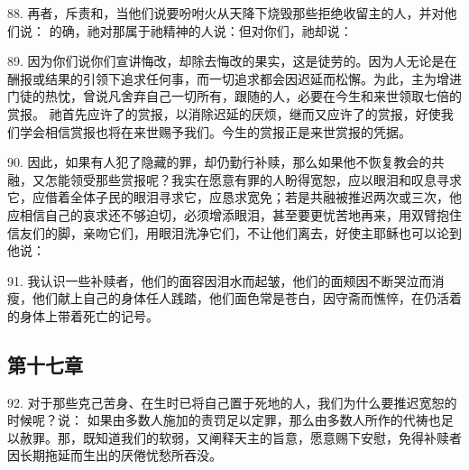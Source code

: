 88. 再者，斥责和，当他们说要吩咐火从天降下烧毁那些拒绝收留主的人，并对他们说： 的确，祂对那属于祂精神的人说：但对你们，祂却说：\par

89. 因为你们说你们宣讲悔改，却除去悔改的果实，这是徒劳的。因为人无论是在酬报或结果的引领下追求任何事，而一切追求都会因迟延而松懈。为此，主为增进门徒的热忱，曾说凡舍弃自己一切所有，跟随的人，必要在今生和来世领取七倍的赏报。 祂首先应许了的赏报，以消除迟延的厌烦，继而又应许了的赏报，好使我们学会相信赏报也将在来世赐予我们。今生的赏报正是来世赏报的凭据。\par

90. 因此，如果有人犯了隐藏的罪，却仍勤行补赎，那么如果他不恢复教会的共融，又怎能领受那些赏报呢？我实在愿意有罪的人盼得宽恕，应以眼泪和叹息寻求它，应借着全体子民的眼泪寻求它，应恳求宽免；若是共融被推迟两次或三次，他应相信自己的哀求还不够迫切，必须增添眼泪，甚至要更忧苦地再来，用双臂抱住信友们的脚，亲吻它们，用眼泪洗净它们，不让他们离去，好使主耶稣也可以论到他说：\par

91. 我认识一些补赎者，他们的面容因泪水而起皱，他们的面颊因不断哭泣而消瘦，他们献上自己的身体任人践踏，他们面色常是苍白，因守斋而憔悴，在仍活着的身体上带着死亡的记号。\par


\subsection{第十七章}

\par

92. 对于那些克己苦身、在生时已将自己置于死地的人，我们为什么要推迟宽恕的时候呢？说： 如果由多数人施加的责罚足以定罪，那么由多数人所作的代祷也足以赦罪。那，既知道我们的软弱，又阐释天主的旨意，愿意赐下安慰，免得补赎者因长期拖延而生出的厌倦忧愁所吞没。\par

